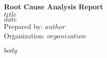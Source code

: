 \documentclass[12pt]{article}
\begin{document}
\begin{titlepage}
   \centering
   \vspace*{60px}
   \Huge\textbf{Root Cause Analysis Report}\\
   \vspace{20px}
   \LARGE{$title$}\\ %
   \vspace{10px}
   \Large{$date$}\\ %
   \vfill
   \Large{Prepared by: $author$}\\ %
   \Large{Organization: $organization$} %
   \vspace{50px}
\end{titlepage}

\newpage
\tableofcontents
\newpage

$body$
\end{document}
